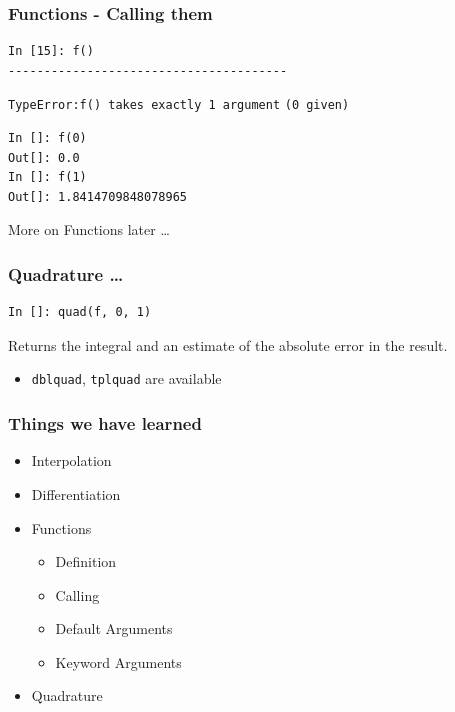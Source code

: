\documentclass[14pt,compress]{beamer}
\newcommand{\typ}[1]{\lstinline{#1}}
\begin{document}
\begin{frame}[fragile]
\frametitle{Functions - Calling them}
\begin{lstlisting}
In [15]: f()
---------------------------------------
\end{lstlisting}
\alert{\typ{TypeError:}}\typ{f() takes exactly 1 argument}
\typ{(0 given)}
\begin{lstlisting}
In []: f(0)
Out[]: 0.0
In []: f(1)
Out[]: 1.8414709848078965
\end{lstlisting}
More on Functions later \ldots
\end{frame}

\begin{frame}[fragile]
\frametitle{Quadrature \ldots}
\begin{lstlisting}
In []: quad(f, 0, 1)
\end{lstlisting}
Returns the integral and an estimate of the absolute error in the result.
\begin{itemize}
\item \typ{dblquad}, \typ{tplquad} are available
\end{itemize}
\end{frame}

\begin{frame}
  \frametitle{Things we have learned}
  \begin{itemize}
  \item Interpolation
  \item Differentiation
  \item Functions
    \begin{itemize}
    \item Definition
    \item Calling
    \item Default Arguments
    \item Keyword Arguments
    \end{itemize}
  \item Quadrature
  \end{itemize}
\end{frame}
\end{document}
